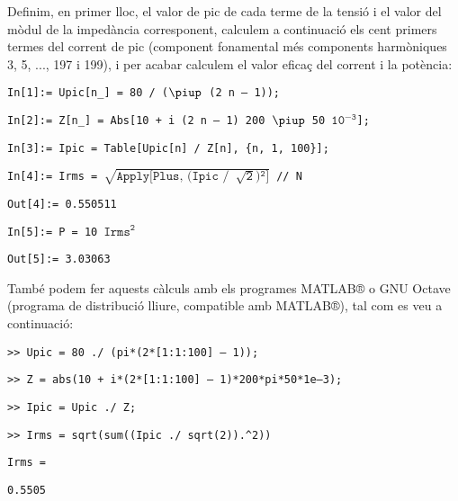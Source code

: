 \begin{exemple}
    Definim, en primer lloc, el valor de pic de cada
     terme de la tensió i el valor del mòdul de la impedància corresponent,
    calculem a continuació els cent primers termes  del corrent de pic (component fonamental més components harmòniques 3, 5, ..., 197 i 199), i
    per acabar calculem el valor eficaç del corrent i la potència:

    \hspace{1cm}\texttt{In[1]:= Upic[n\_] = 80 / ($\mathtt{\piup}$ (2 n -- 1));}

    \hspace{1cm}\texttt{In[2]:= Z[n\_] = Abs[10 + i (2 n -- 1) 200 $\mathtt{\piup}$ 50 $\mathtt{10^{-3}}$];}

    \hspace{1cm}\texttt{In[3]:= Ipic = Table[Upic[n] / Z[n], \{n, 1, 100\}];}

    \hspace{1cm}\texttt{In[4]:= Irms = $\mathtt{\sqrt{\text{Apply[Plus, (Ipic /}\phantom{1} \sqrt{2}\text{)}{\phantom{}^2}\text{]}}}$ // N}

    \hspace{1cm}\texttt{Out[4]:= 0.550511}

    \hspace{1cm}\texttt{In[5]:= P = 10 $\mathtt{Irms^2}$}

    \hspace{1cm}\texttt{Out[5]:= 3.03063}\newline

    També podem fer aquests càlculs amb els programes
    MATLAB® o GNU Octave (programa de distribució lliure, compatible amb MATLAB®), tal com es veu a continuació:


    \hspace{1cm}\texttt{>{}> Upic = 80 ./ (pi*(2*[1:1:100] -- 1));}

    \hspace{1cm}\texttt{>{}> Z = abs(10 + i*(2*[1:1:100] -- 1)*200*pi*50*1e--3);}

    \hspace{1cm}\texttt{>{}> Ipic = Upic ./ Z;}

    \hspace{1cm}\texttt{>{}> Irms = sqrt(sum((Ipic ./ sqrt(2)).\^{}2))}

    \hspace{1cm}\texttt{Irms =}

    \hspace{1cm}\texttt{\phantom{Irms }0.5505}


\end{exemple}
